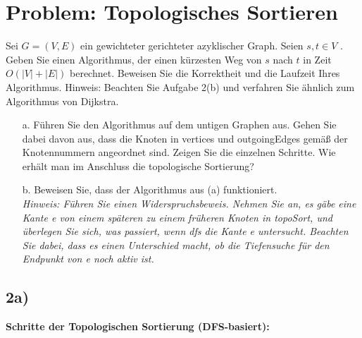 \section{Problem: Topologisches Sortieren}

\vspace{0.5em}
Sei $G = (V, E)$ ein gewichteter gerichteter azyklischer Graph. Seien $s, t \in V$ . Geben
Sie einen Algorithmus, der einen kürzesten Weg von $s$ nach $t$ in Zeit $O(|V | + |E|)$
berechnet. Beweisen Sie die Korrektheit und die Laufzeit Ihres Algorithmus.
Hinweis: Beachten Sie Aufgabe 2(b) und verfahren Sie ähnlich zum Algorithmus
von Dijkstra.

\begin{enumerate}
	\item[a.] Führen Sie den Algorithmus auf dem untigen Graphen aus. Gehen Sie dabei davon aus, dass die Knoten in vertices und outgoingEdges gemäß der Knotennummern angeordnet sind. Zeigen Sie die einzelnen Schritte. Wie erhält man im Anschluss die topologische Sortierung?
	\item[b.] Beweisen Sie, dass der Algorithmus aus (a) funktioniert.\\
	\textit{Hinweis: Führen Sie einen Widerspruchsbeweis. Nehmen Sie an, es gäbe eine Kante e von einem späteren zu einem früheren Knoten in topoSort, und überlegen Sie sich, was passiert, wenn dfs die Kante e untersucht. Beachten Sie dabei, dass es einen Unterschied macht, ob die Tiefensuche für den Endpunkt von e noch aktiv ist.}
\end{enumerate}

\subsection*{2a)}

\textbf{Schritte der Topologischen Sortierung (DFS-basiert):}

